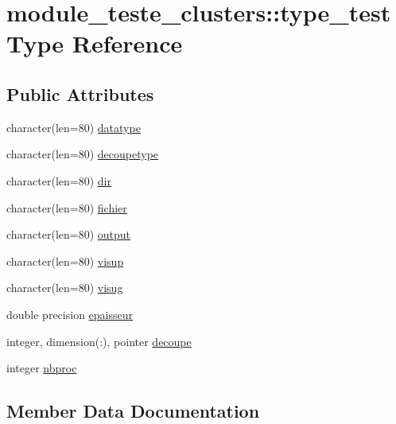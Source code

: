 \hypertarget{structmodule__teste__clusters_1_1type__test}{}\section{module\+\_\+teste\+\_\+clusters\+:\+:type\+\_\+test Type Reference}
\label{structmodule__teste__clusters_1_1type__test}
\subsection*{Public Attributes}
\begin{DoxyCompactItemize}
\item 
character(len=80) \hyperlink{structmodule__teste__clusters_1_1type__test_a8b4d3aabaaea5f2881a91b6001928989}{datatype}
\item 
character(len=80) \hyperlink{structmodule__teste__clusters_1_1type__test_abf7078230df53518aa75cf4c0e883230}{decoupetype}
\item 
character(len=80) \hyperlink{structmodule__teste__clusters_1_1type__test_a3f0c9892ac12f878cef715596063b6a0}{dir}
\item 
character(len=80) \hyperlink{structmodule__teste__clusters_1_1type__test_a75ab1290d6885c0563d6756975f8f9c8}{fichier}
\item 
character(len=80) \hyperlink{structmodule__teste__clusters_1_1type__test_a00b4f0f089f7fa8ecccc6d8bd84cf927}{output}
\item 
character(len=80) \hyperlink{structmodule__teste__clusters_1_1type__test_a4f64d7525145220b6e3e94580d2033dc}{visup}
\item 
character(len=80) \hyperlink{structmodule__teste__clusters_1_1type__test_a44e54c0ee5ae01a2234a6b9e6d7758b6}{visug}
\item 
double precision \hyperlink{structmodule__teste__clusters_1_1type__test_a39ba4beaad65966bff6fd0b3897bf0bc}{epaisseur}
\item 
integer, dimension(\+:), pointer \hyperlink{structmodule__teste__clusters_1_1type__test_a1eceed0de4bd5829751ba0a32b2d2eb4}{decoupe}
\item 
integer \hyperlink{structmodule__teste__clusters_1_1type__test_aecd0c97ab0c069345644bcf354bb7842}{nbproc}
\end{DoxyCompactItemize}


\subsection{Member Data Documentation}
\hypertarget{structmodule__teste__clusters_1_1type__test_a8b4d3aabaaea5f2881a91b6001928989}{}
